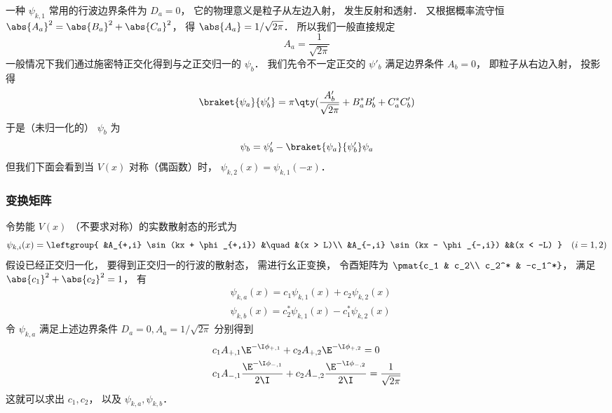 一种 $\psi_{k,1}$ 常用的行波边界条件为 $D_a = 0$， 它的物理意义是粒子从左边入射， 发生反射和透射． 又根据概率流守恒 $\abs{A_a}^2 = \abs{B_a}^2 + \abs{C_a}^2$， 得 $\abs{A_a} = 1/\sqrt{2\pi}$． 所以我们一般直接规定
\begin{equation}\label{ScaNrm_eq10}
A_a = \frac{1}{\sqrt{2\pi}}
\end{equation}
一般情况下我们通过施密特正交化得到与之正交归一的 $\psi_b$． 我们先令不一定正交的 $\psi'_b$ 满足边界条件 $A_b = 0$， 即粒子从右边入射， 投影得
\begin{equation}
\braket{\psi_a}{\psi'_b} = \pi \qty(\frac{A'_b}{\sqrt{2\pi}} + B_a^* B'_b + C_a^*C'_b)
\end{equation}
于是（未归一化的） $\psi_b$ 为
\begin{equation}
\psi_b = \psi'_b - \braket{\psi_a}{\psi'_b}\psi_a
\end{equation}
但我们下面会看到当 $V(x)$ 对称（偶函数）时， $\psi_{k,2}(x) = \psi_{k,1}(-x)$．

\subsubsection{变换矩阵}
令势能 $V(x)$ （不要求对称）的实数散射态的形式为
\begin{equation}
\psi_{k,i}(x) = \leftgroup{
    &A_{+,i} \sin(kx + \phi_{+,i}) &\quad &(x > L)\\
    &A_{-,i} \sin(kx - \phi_{-,i}) &&(x < -L)
} \quad (i = 1,2)
\end{equation}
假设已经正交归一化， 要得到正交归一的行波的散射态， 需进行幺正变换， 令酉矩阵为 $\pmat{c_1 & c_2\\ c_2^* & -c_1^*}$， 满足 $\abs{c_1}^2 + \abs{c_2}^2 = 1$， 有
\begin{equation}
\begin{aligned}
&\psi_{k,a}(x) = c_1\psi_{k,1}(x) + c_2\psi_{k,2}(x)\\
&\psi_{k,b}(x) = c_2^*\psi_{k,1}(x) - c_1^*\psi_{k,2}(x)
\end{aligned}
\end{equation}
令 $\psi_{k,a}$ 满足上述边界条件 $D_a = 0, A_a = 1/\sqrt{2\pi}$ 分别得到
\begin{equation}\label{ScaNrm_eq12}
\begin{aligned}
&c_1 A_{+,1}\E^{-\I\phi_{+,1}} + c_2 A_{+,2}\E^{-\I\phi_{+,2}} = 0\\
&c_1 A_{-,1}\frac{\E^{-\I\phi_{-,1}}}{2\I} + c_2 A_{-,2}\frac{\E^{-\I\phi_{-,2}}}{2\I} = \frac{1}{\sqrt{2\pi}}
\end{aligned}
\end{equation}
这就可以求出 $c_1, c_2$， 以及 $\psi_{k,a}, \psi_{k,b}$．

